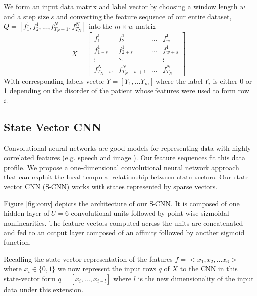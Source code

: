 \documentclass[10pt,twocolumn,letterpaper]{article}
\begin{document}
We form an input data matrix and label vector by choosing a window length $w$ and a step size $s$ and converting the feature sequence of our entire dataset, $Q=[f_1^1, f_2^1,...,f_{T_N-1}^N,f_{T_N}^N]$ into the $m \times w$ matrix
\begin{equation}
X = \begin{bmatrix}
f_1^1 & f_2^1  & ...  & f_w^1 \\ 
f_{1+s}^1 & f_{2+s}^1  & ...  & f_{w+s}^1 \\ 
\vdots  & \ddots  &  & \vdots  \\ 
f_{T_N-w}^N & f_{T_N-w + 1}^N  & ... & f_{T_N}^N
\end{bmatrix}
\end{equation}
With corresponding labels vector $Y=[Y_1,...Y_m]$ where the label $Y_i$ is either 0 or 1 depending on the disorder of the patient whose features were used to form row $i$. 

\subsection{State Vector CNN}
\label{sec:CNN}
Convolutional neural networks are good models for representing data with highly correlated features (e.g.  speech and image \cite{Krizhevsky:2012wl, hamidss, Bouvrie:2006vb,lecun}). Our feature sequences fit this data profile. We propose a one-dimensional convolutional neural network approach that can exploit the local-temporal relationship between state vectors. Our state vector CNN (S-CNN) works with states represented by sparse vectors. %


Figure \ref{fig:conv} depicts the architecture of our S-CNN. It is composed of one hidden layer of $U=6$ convolutional units followed by point-wise sigmoidal nonlinearities. The feature vectors computed across the units are concatenated and fed to an output layer composed of an affinity followed by another sigmoid function.

Recalling the state-vector representation of the features $f=<x_1,x_2,...x_6 >$ where $x_i \in \{0,1\}$ we now represent the input rows $q$ of $X$ to the CNN in this state-vector form $q=[x_i,...,x_{i+l}]$ where $l$ is the new dimensionality of the input data under this extension.
\end{document}
